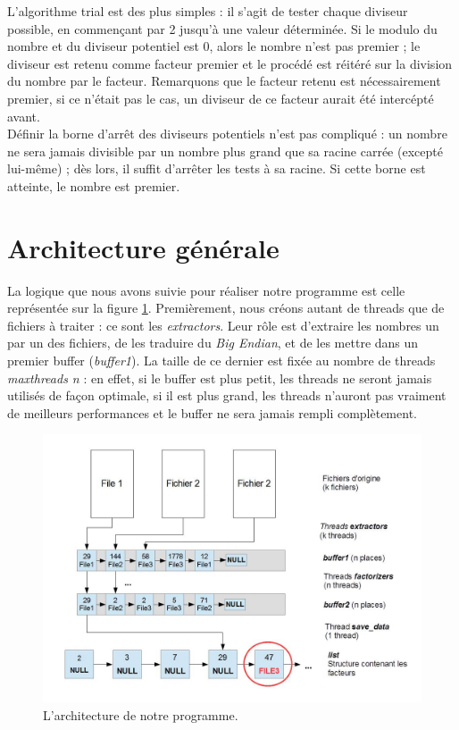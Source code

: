 \documentclass{article}
\begin{document}
L'algorithme trial est des plus simples : il s'agit de tester chaque diviseur possible, en commençant
par 2 jusqu'à une valeur déterminée. Si le modulo du nombre et du diviseur potentiel est 0, alors 
le nombre n'est pas premier ; le diviseur est retenu comme facteur premier et le procédé est réitéré
sur la division du nombre par le facteur. Remarquons que le facteur retenu est nécessairement premier,
si ce n'était pas le cas, un diviseur de ce facteur aurait été intercépté avant.\\

Définir la borne d'arrêt des diviseurs potentiels n'est pas compliqué : un nombre ne sera jamais 
divisible par un nombre plus grand que sa racine carrée (excepté lui-même) ; dès lors, il suffit
d'arrêter les tests à sa racine. Si cette borne est atteinte, le nombre est premier.

\section{Architecture générale}
La logique que nous avons suivie pour réaliser notre programme est celle représentée sur la figure \ref{fig:arch}. 
Premièrement, nous créons autant de threads que de fichiers à traiter : ce sont les \emph{extractors}. 
Leur rôle est d'extraire les nombres un par un des fichiers, de les traduire du \emph{Big Endian}, et de les
mettre dans un premier buffer (\emph{buffer1}). La taille de ce dernier est fixée au nombre de threads 
\emph{maxthreads n} : en effet, si le buffer est plus petit, les threads ne seront jamais utilisés de façon
optimale, si il est plus grand, les threads n'auront pas vraiment de meilleurs performances et le buffer ne
sera jamais rempli complètement.

\begin{figure}[ht]
	\centering
	\includegraphics[scale=0.3]{img/arch.jpg}
	\caption{L'architecture de notre programme.}
	\label{fig:arch}
\end{figure}
\end{document}
